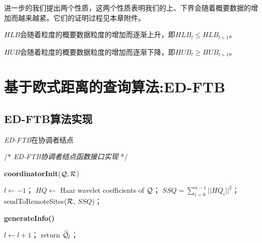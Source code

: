 进一步的我们提出两个性质，这两个性质表明我们的上、下界会随着概要数据的增加而越来越紧。它们的证明过程见本章附件。
\begin{property}[]\label{theory:lower}
	$HLB$会随着粒度的概要数据粒度的增加而逐渐上升，即$HLB_{l} \le HLB_{l+1}$。
\end{property}

\begin{property}[]\label{theory:upper}
	$HUB$会随着粒度的概要数据粒度的增加而逐渐下降，即$HUB_{l} \ge HUB_{l+1}$。
\end{property}

 \section{基于欧式距离的查询算法:ED-FTB}\label{sec-c4-algorithm}
 \subsection{ED-FTB算法实现}
\begin{algorithm}[t]
	\renewcommand{\baselinestretch}{1}
	\caption{{\sl ED-FTB}\label{alg:EDCoordinator}在协调者结点}
	\begin{algorithmic}[2]
		\STATE /* \emph{ED-FTB协调者结点函数接口实现} */
	\end{algorithmic}
	\textbf{coordinatorInit}(${\cal Q} ,  {\cal R}$)
	\begin{algorithmic}[1]
		\STATE  $l\leftarrow -1$；
		\STATE $HQ \leftarrow$ Haar wavelet coefficients of $\cal Q$；
		\STATE $SSQ = \sum_{i=0}^{n-1}||HQ_{i}||^2$；
		\STATE 	\textsf{sendToRemoteSites}(${\cal R}$, $SSQ$)；
	\end{algorithmic}
	
	\textbf{generateInfo()}
	\begin{algorithmic}[1]
		\STATE $l\leftarrow l+1$；
		\STATE return $\widehat {\cal Q}_{l}$；
	\end{algorithmic}
\end{algorithm}

